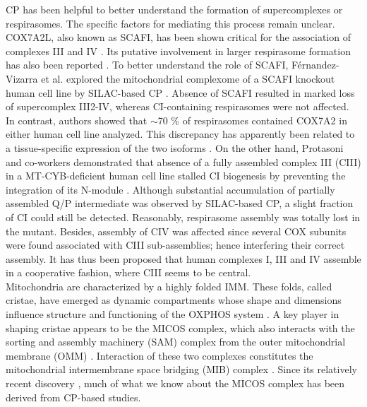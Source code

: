 CP has been helpful to better understand the formation of supercomplexes or respirasomes. The specific factors for mediating this process remain unclear. COX7A2L, also known as SCAFI, has been shown critical for the association of complexes III and IV \cite{Perez-Perez_2016}. Its putative involvement in larger respirasome formation has also been reported \cite{Lapuente-Brun_2013}. To better understand the role of SCAFI, Férnandez-Vizarra et al. explored the mitochondrial complexome of a SCAFI knockout human cell line by SILAC-based CP \cite{Fernández-Vizarra_2021}. Absence of SCAFI resulted in marked loss of supercomplex III2-IV, whereas CI-containing respirasomes were not affected. In contrast, authors showed that $\sim$70 \% of respirasomes contained COX7A2 in either human cell line analyzed. This discrepancy has apparently been related to a tissue-specific expression of the two isoforms \cite{Lapuente-Brun_2013}. On the other hand, Protasoni and co-workers demonstrated that absence of a fully assembled complex III (CIII) in a MT-CYB-deficient human cell line stalled CI biogenesis by preventing the integration of its N-module \cite{Protasoni_2020}. Although substantial accumulation of partially assembled Q/P intermediate was observed by SILAC-based CP, a slight fraction of CI could still be detected. Reasonably, respirasome assembly was totally lost in the mutant. Besides, assembly of CIV was affected since several COX subunits were found associated with CIII sub-assemblies; hence interfering their correct assembly. It has thus been proposed that human complexes I, III and IV assemble in a cooperative fashion, where CIII seems to be central.\\
Mitochondria are characterized by a highly folded IMM. These folds, called cristae, have emerged as dynamic compartments whose shape and dimensions influence structure and functioning of the OXPHOS system \cite{Cogliati_2016}. A key player in shaping cristae appears to be the MICOS complex, which also interacts with the sorting and assembly machinery (SAM) complex from the outer mitochondrial membrane (OMM) \cite{Huynen_2016}. Interaction of these two complexes constitutes the mitochondrial intermembrane space bridging (MIB) complex \cite{Ott_2015}. Since its relatively recent discovery \cite{Harner_2011}, much of what we know about the MICOS complex has been derived from CP-based studies.\\
